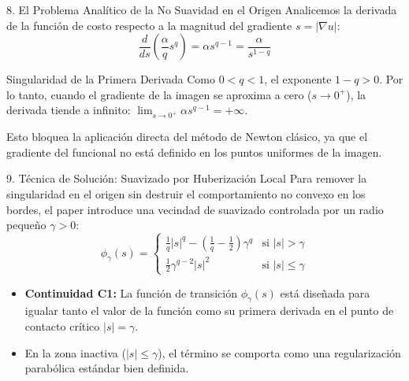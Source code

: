 \documentclass[aspectratio=169,11pt]{beamer}
\begin{document}
\begin{frame}{8. El Problema Analítico de la No Suavidad en el Origen}
    Analicemos la derivada de la función de costo respecto a la magnitud del gradiente $s = |\nabla u|$:
    \begin{equation}
        \frac{d}{ds} \left( \frac{\alpha}{q} s^q \right) = \alpha s^{q-1} = \frac{\alpha}{s^{1-q}}
    \end{equation}
    \begin{alertblock}{Singularidad de la Primera Derivada}
        Como $0 < q < 1$, el exponente $1-q > 0$. Por lo tanto, cuando el gradiente de la imagen se aproxima a cero ($s \to 0^+$), la derivada \alert{tiende a infinito}: $\lim_{s \to 0^+} \alpha s^{q-1} = +\infty$.
    \end{alertblock}
    Esto bloquea la aplicación directa del método de Newton clásico, ya que el gradiente del funcional no está definido en los puntos uniformes de la imagen.
\end{frame}

\begin{frame}{9. Técnica de Solución: Suavizado por Huberización Local}
    Para remover la singularidad en el origen sin destruir el comportamiento no convexo en los bordes, el paper introduce una vecindad de suavizado controlada por un radio pequeño $\gamma > 0$:
    \begin{equation}
        \phi_\gamma(s) = 
        \begin{cases} 
            \frac{1}{q} |s|^q - \left(\frac{1}{q} - \frac{1}{2}\right)\gamma^q & \text{si } |s| > \gamma \\ 
            \frac{1}{2} \gamma^{q-2} |s|^2 & \text{si } |s| \le \gamma 
        \end{cases}
    \end{equation}
    \begin{itemize}
        \item \textbf{Continuidad C1:} La función de transición $\phi_\gamma(s)$ está diseñada para igualar tanto el valor de la función como su primera derivada en el punto de contacto crítico $|s| = \gamma$.
        \item En la zona inactiva ($|s| \le \gamma$), el término se comporta como una regularización parabólica estándar bien definida.
    \end{itemize}
\end{frame}
\end{document}
